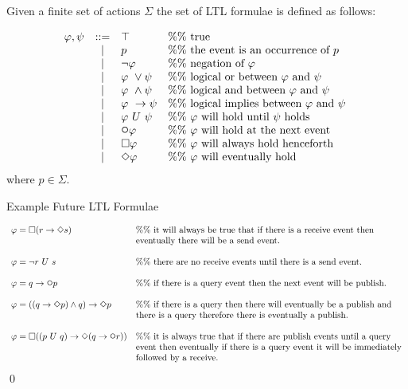 \begin{definition}Given a finite set of actions $ \Sigma $ the set of LTL formulae is defined as follows:

$$ \begin{array}{lcll}
\varphi, \psi & ::= & \top & \%\%\ \mbox{true}\
\\
& | & p & \%\%\ \mbox{the event is an occurrence of}\ p\ 
\\ 
&| & \neg\varphi & \%\%\ \mbox{negation of}\ \varphi\ 
\\
&| & \varphi\ \lor \psi & \%\%\ \mbox{logical or between}\ \varphi\ \mbox{and}\ \psi\
\\
&| & \varphi\ \land \psi & \%\%\ \mbox{logical and between}\ \varphi\ \mbox{and}\ \psi\
\\
& | & \varphi\ \rightarrow \psi & \%\%\ \mbox{logical implies between}\ \varphi\ \mbox{and}\ \psi\
\\
& | & \varphi\ U\ \psi & \%\%\ \varphi\ \mbox{will hold until}\ \psi\ \mbox{holds}\
\\
& | & \LTLnext\varphi & \%\%\ \varphi\ \mbox{will hold at the next event}\ 
\\
& | & \LTLalways\varphi & \%\%\ \varphi\ \mbox{will always hold henceforth}\
\\
& | & \LTLeventually\varphi & \%\%\ \varphi\ \mbox{will eventually hold}\ 
\end{array}$$
where $ p \in \Sigma $.
\end{definition}

\begin{myEx} Example Future LTL Formulae

$$\begin{array}{ll}
\varphi = \LTLalways(r \rightarrow \LTLeventually s)& \%\%\ \mbox{it will always be true that if there is a receive event then}\\
& \mbox{eventually there will be a send event.}
\\
\\
\varphi = \neg r\ U\ s& \%\%\ \mbox{there are no receive events until there is a send event.}
\\
\\
\varphi = q \rightarrow \LTLnext p& \%\%\ \mbox{if there is a query event then the next event will be publish.}
\\
\\
\varphi = ((q \rightarrow \LTLeventually p) \land q) \rightarrow \LTLeventually p& \%\%\ \mbox{if there is a query then there will eventually be a publish and}\\
& \mbox{there is a query therefore there is eventually a publish.}
\\
\\
\varphi = \LTLalways((p \ U\ q) \rightarrow \LTLeventually(q \rightarrow \LTLnext r))& \%\% \mbox{ it is always true that if there are publish events until a query}\\ & \mbox{event then eventually if there is a query event it will be immediately}\\ & \mbox{followed by a receive.}
\end{array}$$
\qed
\end{myEx}

